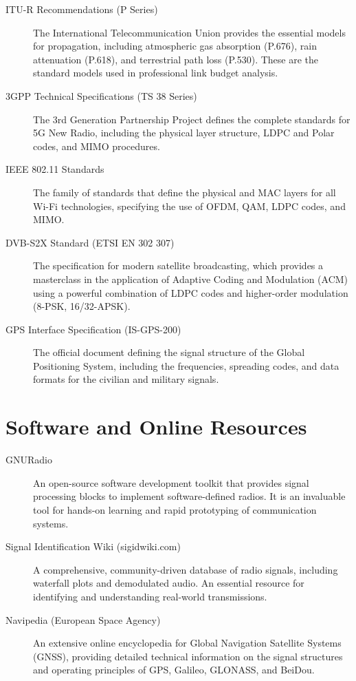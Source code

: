 \begin{description}
    \item[ITU-R Recommendations (P Series)] The International Telecommunication Union provides the essential models for propagation, including atmospheric gas absorption (P.676), rain attenuation (P.618), and terrestrial path loss (P.530). These are the standard models used in professional link budget analysis.
    \item[3GPP Technical Specifications (TS 38 Series)] The 3rd Generation Partnership Project defines the complete standards for 5G New Radio, including the physical layer structure, LDPC and Polar codes, and MIMO procedures.
    \item[IEEE 802.11 Standards] The family of standards that define the physical and MAC layers for all Wi-Fi technologies, specifying the use of OFDM, QAM, LDPC codes, and MIMO.
    \item[DVB-S2X Standard (ETSI EN 302 307)] The specification for modern satellite broadcasting, which provides a masterclass in the application of Adaptive Coding and Modulation (ACM) using a powerful combination of LDPC codes and higher-order modulation (8-PSK, 16/32-APSK).
    \item[GPS Interface Specification (IS-GPS-200)] The official document defining the signal structure of the Global Positioning System, including the frequencies, spreading codes, and data formats for the civilian and military signals.
\end{description}

\section{Software and Online Resources}

\begin{description}
    \item[GNURadio] An open-source software development toolkit that provides signal processing blocks to implement software-defined radios. It is an invaluable tool for hands-on learning and rapid prototyping of communication systems.
    \item[Signal Identification Wiki (sigidwiki.com)] A comprehensive, community-driven database of radio signals, including waterfall plots and demodulated audio. An essential resource for identifying and understanding real-world transmissions.
    \item[Navipedia (European Space Agency)] An extensive online encyclopedia for Global Navigation Satellite Systems (GNSS), providing detailed technical information on the signal structures and operating principles of GPS, Galileo, GLONASS, and BeiDou.
\end{description}